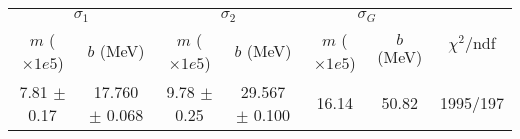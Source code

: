 \begin{tabular}{cc|cc|cc||c}
\multicolumn{2}{c|}{$\sigma_1$} & \multicolumn{2}{|c}{$\sigma_2$} & \multicolumn{2}{|c}{$\sigma_G$}  & \multirow{2}{*}{$\chi^2/$ndf}\\
$m$ ($\times1e5$) & $b$ (MeV) & $m$ ($\times1e5$) & $b$ (MeV) & $m$ ($\times1e5$) & $b$ (MeV) & \\
\hline
7.81 $\pm$ 0.17 & 17.760 $\pm$ 0.068 & 9.78 $\pm$ 0.25 & 29.567 $\pm$ 0.100 & 16.14 & 50.82 & 1995/197\\
\end{tabular}
